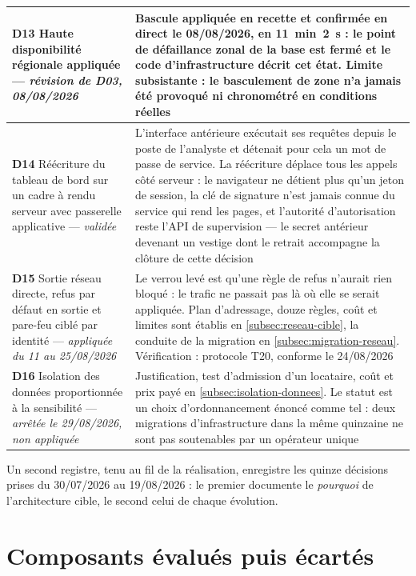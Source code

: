 \begin{longtable}{|P{3.2cm}|P{12.1cm}|}
\textbf{D13} Haute disponibilité régionale appliquée --- \emph{révision de D03, 08/08/2026} &
Bascule appliquée en recette et confirmée en direct le 08/08/2026, en 11~min~2~s : le point de
défaillance zonal de la base est fermé et le code d'infrastructure décrit cet état. Limite
subsistante : le basculement de zone n'a jamais été provoqué ni chronométré en conditions
réelles \\ \hline
\textbf{D14} Réécriture du tableau de bord sur un cadre à rendu serveur avec passerelle applicative
--- \emph{validée} &
L'interface antérieure exécutait ses requêtes depuis le poste de l'analyste et détenait pour cela
un mot de passe de service. La réécriture déplace tous les appels côté serveur : le navigateur ne
détient plus qu'un jeton de session, la clé de signature n'est jamais connue du service qui rend
les pages, et l'autorité d'autorisation reste l'API de supervision --- le secret antérieur devenant
un vestige dont le retrait accompagne la clôture de cette décision \\ \hline
\textbf{D15} Sortie réseau directe, refus par défaut en sortie et pare-feu ciblé par identité ---
\emph{appliquée du 11 au 25/08/2026} &
Le verrou levé est qu'une règle de refus n'aurait rien bloqué : le trafic ne passait pas là où elle
se serait appliquée. Plan d'adressage, douze règles, coût et limites sont établis en
\cref{subsec:reseau-cible}, la conduite de la migration en \cref{subsec:migration-reseau}.
Vérification : protocole T20, conforme le 24/08/2026 \\ \hline
\textbf{D16} Isolation des données proportionnée à la sensibilité ---
\emph{arrêtée le 29/08/2026, non appliquée} &
Justification, test d'admission d'un locataire, coût et prix payé en
\cref{subsec:isolation-donnees}. Le statut est un choix d'ordonnancement énoncé comme tel : deux
migrations d'infrastructure dans la même quinzaine ne sont pas soutenables par un opérateur
unique \\
\hline
\end{longtable}
\endgroup

Un second registre, tenu au fil de la réalisation, enregistre les quinze décisions prises du
30/07/2026 au 19/08/2026 : le premier documente le \emph{pourquoi} de l'architecture cible, le
second celui de chaque évolution.

\section{Composants évalués puis écartés}
\label{ann:composants-ecartes}

